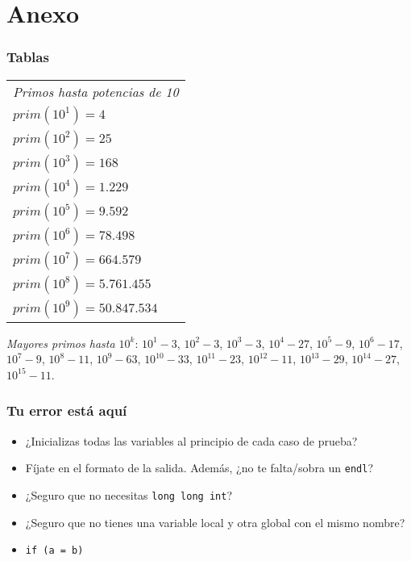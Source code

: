 \chapter{Anexo}

\subsection{Tablas}

\begin{tabular}{l}
	\emph{Primos hasta potencias de 10} \\
	$prim(10^1) = 4$ \\
	$prim(10^2) = 25$ \\
	$prim(10^3) = 168$ \\
	$prim(10^4) = 1.229$ \\
	$prim(10^5) = 9.592$ \\
	$prim(10^6) = 78.498$ \\
	$prim(10^7) = 664.579$ \\
	$prim(10^8) = 5.761.455$ \\
	$prim(10^9) = 50.847.534$ \\
\end{tabular}
\newline
\newline
\emph{Mayores primos hasta $10^k$}: $10^1-3$, $10^2-3$, $10^3-3$, $10^4-27$, $10^5-9$, $10^6-17$, $10^7-9$, $10^8-11$, $10^9-63$, $10^{10}-33$, $10^{11}-23$, $10^{12}-11$, $10^{13}-29$, $10^{14}-27$, $10^{15}-11$.

\subsection{Tu error está aquí}
\begin{itemize}
	\item ¿Inicializas todas las variables al principio de cada caso de prueba?
	\item Fíjate en el formato de la salida. Además, ¿no te falta/sobra un \texttt{endl}?
	\item ¿Seguro que no necesitas \texttt{long long int}?
	\item ¿Seguro que no tienes una variable local y otra global con el mismo nombre?
	\item \texttt{if (a = b)}
\end{itemize}